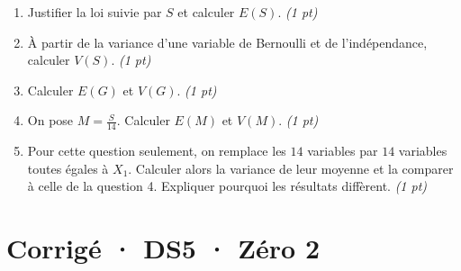 \begin{enumerate}

\item Justifier la loi suivie par $S$ et calculer $E(S)$. \hfill\textit{(1 pt)}

\item À partir de la variance d'une variable de Bernoulli et de l'indépendance, calculer $V(S)$. \hfill\textit{(1 pt)}

\item Calculer $E(G)$ et $V(G)$. \hfill\textit{(1 pt)}

\item On pose $M=\frac S{14}$. Calculer $E(M)$ et $V(M)$. \hfill\textit{(1 pt)}

\item Pour cette question seulement, on remplace les $14$ variables par $14$ variables toutes égales à $X_1$. Calculer alors la variance de leur moyenne et la comparer à celle de la question 4. Expliquer pourquoi les résultats diffèrent. \hfill\textit{(1 pt)}

\end{enumerate}

\ifprof\clearpage

\section*{Corrigé · DS5 · Zéro 2}\label{cor:7-2}

